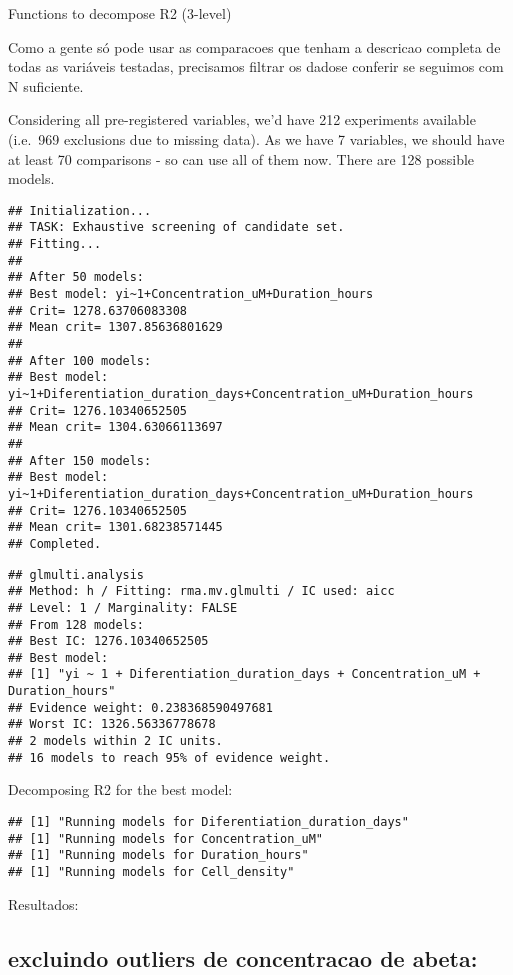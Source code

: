\documentclass[
]{article}
\begin{document}
Functions to decompose R2 (3-level)

Como a gente só pode usar as comparacoes que tenham a descricao completa
de todas as variáveis testadas, precisamos filtrar os dadose conferir se
seguimos com N suficiente.

Considering all pre-registered variables, we'd have 212 experiments
available (i.e.~969 exclusions due to missing data). As we have 7
variables, we should have at least 70 comparisons - so can use all of
them now. There are 128 possible models.

\begin{verbatim}
## Initialization...
## TASK: Exhaustive screening of candidate set.
## Fitting...
## 
## After 50 models:
## Best model: yi~1+Concentration_uM+Duration_hours
## Crit= 1278.63706083308
## Mean crit= 1307.85636801629
## 
## After 100 models:
## Best model: yi~1+Diferentiation_duration_days+Concentration_uM+Duration_hours
## Crit= 1276.10340652505
## Mean crit= 1304.63066113697
## 
## After 150 models:
## Best model: yi~1+Diferentiation_duration_days+Concentration_uM+Duration_hours
## Crit= 1276.10340652505
## Mean crit= 1301.68238571445
## Completed.
\end{verbatim}

\begin{verbatim}
## glmulti.analysis
## Method: h / Fitting: rma.mv.glmulti / IC used: aicc
## Level: 1 / Marginality: FALSE
## From 128 models:
## Best IC: 1276.10340652505
## Best model:
## [1] "yi ~ 1 + Diferentiation_duration_days + Concentration_uM + Duration_hours"
## Evidence weight: 0.238368590497681
## Worst IC: 1326.56336778678
## 2 models within 2 IC units.
## 16 models to reach 95% of evidence weight.
\end{verbatim}

Decomposing R2 for the best model:

\begin{verbatim}
## [1] "Running models for Diferentiation_duration_days"
## [1] "Running models for Concentration_uM"
## [1] "Running models for Duration_hours"
## [1] "Running models for Cell_density"
\end{verbatim}

Resultados:

\hypertarget{excluindo-outliers-de-concentracao-de-abeta}{%
\subsection{excluindo outliers de concentracao de
abeta:}\label{excluindo-outliers-de-concentracao-de-abeta}}
\end{document}
